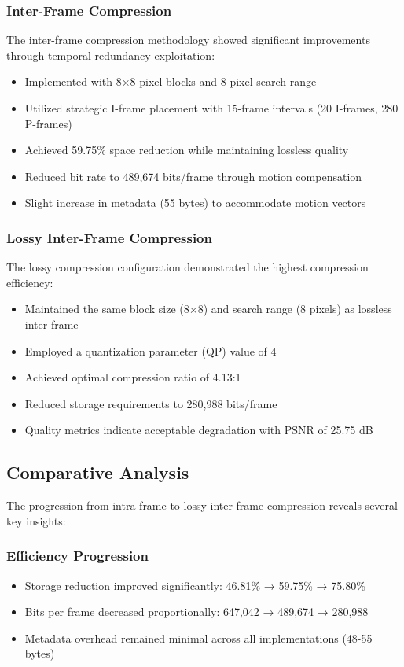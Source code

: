 \documentclass[a4paper,14pt]{article}
\begin{document}
\subsubsection{Inter-Frame Compression}
The inter-frame compression methodology showed significant improvements through temporal redundancy exploitation:
\begin{itemize}
    \item Implemented with 8×8 pixel blocks and 8-pixel search range
    \item Utilized strategic I-frame placement with 15-frame intervals (20 I-frames, 280 P-frames)
    \item Achieved 59.75\% space reduction while maintaining lossless quality
    \item Reduced bit rate to 489,674 bits/frame through motion compensation
    \item Slight increase in metadata (55 bytes) to accommodate motion vectors
\end{itemize}

\subsubsection{Lossy Inter-Frame Compression}
The lossy compression configuration demonstrated the highest compression efficiency:
\begin{itemize}
    \item Maintained the same block size (8×8) and search range (8 pixels) as lossless inter-frame
    \item Employed a quantization parameter (QP) value of 4
    \item Achieved optimal compression ratio of 4.13:1
    \item Reduced storage requirements to 280,988 bits/frame
    \item Quality metrics indicate acceptable degradation with PSNR of 25.75 dB
\end{itemize}

\subsection{Comparative Analysis}
The progression from intra-frame to lossy inter-frame compression reveals several key insights:

\subsubsection{Efficiency Progression}
\begin{itemize}
    \item Storage reduction improved significantly: 46.81\% → 59.75\% → 75.80\%
    \item Bits per frame decreased proportionally: 647,042 → 489,674 → 280,988
    \item Metadata overhead remained minimal across all implementations (48-55 bytes)
\end{itemize}
\end{document}
